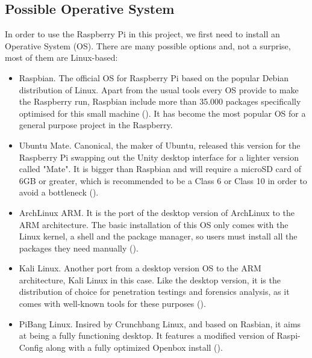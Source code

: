 	\subsection{Possible Operative System}
	In order to use the Raspberry Pi in this project, we first need to install an Operative System (OS). There are many possible options and, not a surprise, most of them are Linux-based:

	\begin{itemize}
		\item Raspbian. The official OS for Raspberry Pi based on the popular Debian distribution of Linux. Apart from the usual tools every OS provide to make the Raspberry run, Raspbian include more than 35.000 packages specifically optimised for this small machine (\cite{raspbian_main_website}). It has become the most popular OS for a general purpose project in the Raspberry. 
		\item Ubuntu Mate. Canonical, the maker of Ubuntu, released this version for the Raspberry Pi swapping out the Unity desktop interface for a lighter version called "Mate". It is bigger than Raspbian and will require a microSD card of 6GB or greater, which is recommended to be a Class 6 or Class 10 in order to avoid a bottleneck (\cite{ubuntu_mate_review}).
		\item ArchLinux ARM. It is the port of the desktop version of ArchLinux to the ARM architecture. The basic installation of this OS only comes with the Linux kernel, a shell and the package manager, so users must install all the packages they need manually (\cite{archlinux_arm_main_website}).
		\item Kali Linux. Another port from a desktop version OS to the ARM architecture, Kali Linux in this case. Like the desktop version, it is the distribution of choice for penetration testings and forensics analysis, as it comes with well-known tools for these purposes (\cite{kalilinux_website}).
		\item PiBang Linux. Insired by Crunchbang Linux, and based on Rasbian, it aims at being a fully functioning desktop. It features a modified version of Raspi-Config along with a fully optimized Openbox install (\cite{pibang_website}).
	\end{itemize} 



                                                     
